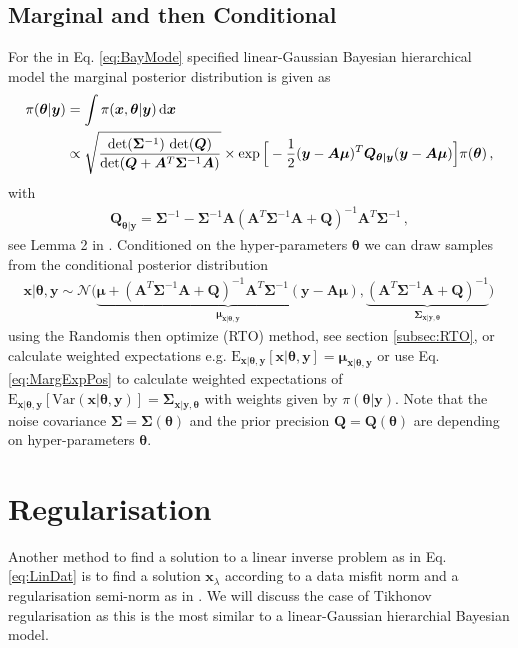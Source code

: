\subsection{Marginal and then Conditional}
\label{subsec:MTC}
For the in Eq. \ref{eq:BayMode} specified linear-Gaussian Bayesian hierarchical model the marginal posterior distribution is given as
\begin{align}
	\pi(\bm{\theta} | \bm{y}) &= \int \pi(\bm{x}, \bm{\theta} | \bm{y}) \mathop{}\!\mathrm{d} \bm{x} \\ 
	\label{eq:condHyper}
	&\propto \sqrt{ \frac{ \det( \bm{\Sigma}^{-1} ) \,  \det( \bm{Q}) }{\det( \bm{Q} + \bm{A}^T \bm{\Sigma}^{-1} \bm{A} ) } } \times \exp \Big[ - \frac{1}{2}(\bm{y} -\bm{A \mu})^T \bm{Q}_{\bm{\theta|y}} (\bm{y} -\bm{A \mu}) \Big] \pi(\bm{\theta}) \, ,
\end{align}
with
\begin{align}
	\bm{Q}_{\bm{\theta|y}} = \bm{\Sigma}^{-1} - \bm{\Sigma}^{-1} \bm{A} (\bm{A}^T \bm{\Sigma}^{-1} \bm{A} + \bm{Q} )^{-1} \bm{A}^T \bm{\Sigma}^{-1} \,  ,
\end{align}
see Lemma 2 in \cite{fox2016fast}.
Conditioned on the hyper-parameters $\bm{\theta}$ we can draw samples from the conditional posterior distribution
\begin{align}
	\bm{x}| \bm{\theta}, \bm{y}  \sim \mathcal{N}\big( \underbrace{\bm{\mu} + (\bm{A}^T \bm{\Sigma}^{-1} \bm{A} + \bm{Q} )^{-1} \bm{A}^T \bm{\Sigma}^{-1} (\bm{y} - \bm{A} \bm{\mu})}_{\bm{\mu}_{\bm{x}|  \bm{\theta}, \bm{y}}} , \underbrace{ (\bm{A}^T \bm{\Sigma}^{-1} \bm{A} + \bm{Q} )^{-1}}_{\bm{\Sigma}_{\bm{x}| \bm{y} , \bm{\theta}}} \big) \, 
\end{align}
using the Randomis then optimize (RTO) method, see section \ref{subsec:RTO},
or calculate weighted expectations e.g. $ \text{E}_{\bm{x}|\bm{\theta},\bm{y}} [\bm{x}| \bm{\theta}, \bm{y}] = \bm{\mu}_{\bm{x}| \bm{\theta}, \bm{y} }$ or use Eq. \ref{eq:MargExpPos} to calculate weighted expectations of $\text{E}_{\bm{x}|\bm{\theta},\bm{y}} [\text{Var}(\bm{x}| \bm{\theta}, \bm{y})]  = \bm{\Sigma}_{\bm{x}| \bm{y} , \bm{\theta}}$ with weights given by $\pi(\bm{\theta} | \bm{y} )$.
Note that the noise covariance $\bm{\Sigma}= \bm{\Sigma}( \bm{\theta}) $ and the prior precision $\bm{Q} = \bm{Q}( \bm{\theta})$ are depending on hyper-parameters $\bm{\theta}$.

\section{Regularisation}
\label{sec:regularise}
Another method to find a solution to a linear inverse problem as in Eq. \ref{eq:LinDat} is to find a solution $\bm{x}_{\lambda}$ according to a data misfit norm and a regularisation semi-norm as in \cite{fox2016fast}.
We will discuss the case of Tikhonov regularisation \cite{kaipio2005statinv,tan2016LecNot} as this is the most similar to a linear-Gaussian hierarchial Bayesian model.


